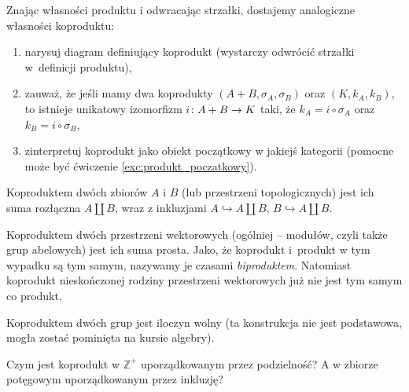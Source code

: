 \begin{exc}
  Znając własności produktu i odwracając strzałki, dostajemy analogiczne własności koproduktu:
  \begin{enumerate}
    \item narysuj diagram definiujący koprodukt (wystarczy odwrócić strzałki w~definicji produktu),
    \item zauważ, że jeśli mamy dwa koprodukty $(A+B, \sigma_A, \sigma_B)$ oraz $(K, k_A, k_B)$, to istnieje unikatowy izomorfizm $i\colon A+B\to K$ taki, że $k_A=i\circ \sigma_A$ oraz $k_B=i\circ\sigma_B$,
    \item zinterpretuj koprodukt jako obiekt początkowy w jakiejś kategorii (pomocne może być ćwiczenie \ref{exc:produkt_poczatkowy}).
  \end{enumerate}
\end{exc}

\begin{exmp}
  Koproduktem dwóch zbiorów $A$ i $B$ (lub przestrzeni topologicznych) jest ich suma rozłączna $A\coprod B$, wraz z inkluzjami $A\hookrightarrow A\coprod B$, $B\hookrightarrow A\coprod B$.
\end{exmp}

\begin{exmp}
  Koproduktem dwóch przestrzeni wektorowych (ogólniej -- modułów, czyli także grup abelowych) jest ich suma prosta. Jako, że koprodukt i~produkt w tym wypadku są tym samym, nazywamy je czasami \emph{biproduktem}. Natomiast koprodukt nieskończonej rodziny przestrzeni wektorowych już nie jest tym samym co produkt.
\end{exmp}

\begin{exmp}
  Koproduktem dwóch grup jest iloczyn wolny (ta konstrukcja nie jest podstawowa, mogła zostać pominięta na kursie algebry).
\end{exmp}

\begin{exc}
  Czym jest koprodukt w $\mathbb Z^+$ uporządkowanym przez podzielność? A w zbiorze potęgowym uporządkowanym przez inkluzję?
\end{exc}

